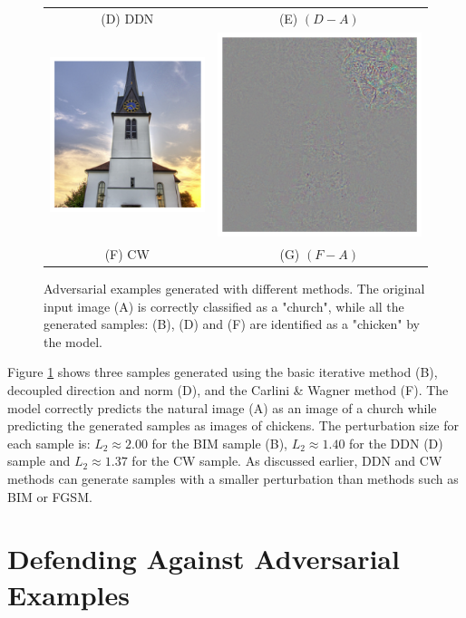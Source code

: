 \begin{figure}[ht]
\begin{tabular}{@{}cc@{}}
        \\
        (D) DDN & (E) $(D - A)$ \\
        \includegraphics[width=.32\columnwidth]{Figures/related/attacks/cw_0.62_chicken.png}
                &
        \includegraphics[width=.32\columnwidth]{Figures/related/attacks/cw_0.62_chicken_diff2.png}
        \\
        (F) CW  & (G) $(F - A)$
    \end{tabular}
    \caption{ Adversarial examples generated with different methods. The
        original input image (A) is correctly classified as a "church", while
        all the generated samples: (B), (D) and (F) are identified as a
        "chicken" by the model. }
    \label{fig:samples_ae}
\end{figure}

\clearpage
Figure \ref{fig:samples_ae} shows three samples generated using the basic
iterative method (B), decoupled direction and norm (D), and the Carlini \&
Wagner method (F). The model correctly predicts the natural image (A) as an
image of a church while predicting the generated samples as images of chickens.
The perturbation size for each sample is: $L_2 \approx 2.00$ for the BIM sample
(B), $L_2 \approx 1.40$ for the DDN (D) sample and $L_2 \approx 1.37$ for the CW
sample. As discussed earlier, DDN and CW methods can generate samples with a
smaller perturbation than methods such as BIM or FGSM.
\clearpage

\section{Defending Against Adversarial Examples}
\label{sec:defending_adgainst_adversarial_examples}

